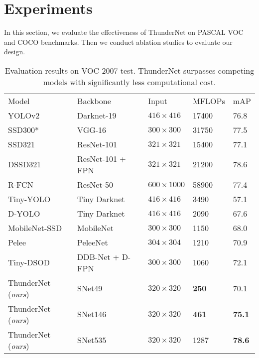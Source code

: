 

\section{Experiments}

In this section, we evaluate the effectiveness of ThunderNet on PASCAL VOC \cite{everingham2010pascal} and COCO \cite{lin2014microsoft} benchmarks.
Then we conduct ablation studies to evaluate our design.

\begin{table*}[!t]
\scriptsize
\centering
\begin{tabular}{p{11em}|P{10em}|P{8em}|P{6em}|P{4em}}
Model & Backbone & Input & MFLOPs & mAP \\ 
YOLOv2 \cite{redmon2017yolo9000} & Darknet-19 & $416 \times 416$ & 17400 & 76.8 \\
SSD300* \cite{liu2016ssd} & VGG-16 & $300 \times 300$ & 31750 & 77.5 \\
SSD321 \cite{fu2017dssd} & ResNet-101 & $321 \times 321$ & 15400 & 77.1 \\
DSSD321 \cite{fu2017dssd} & ResNet-101 + FPN & $321 \times 321$ & 21200 & 78.6 \\
R-FCN \cite{dai2016r} & ResNet-50 & $600 \times 1000$ & 58900 & 77.4 \\ \hline
Tiny-YOLO \cite{redmon2017yolo9000} & Tiny Darknet & $416 \times 416$ & 3490 & 57.1 \\
D-YOLO \cite{mehta2018object} & Tiny Darknet & $416 \times 416$ & 2090 & 67.6 \\
MobileNet-SSD \cite{wang2018pelee} & MobileNet & $300 \times 300$ & 1150 & 68.0 \\
Pelee \cite{wang2018pelee} & PeleeNet & $304 \times 304$ & 1210 & 70.9 \\
Tiny-DSOD \cite{li2018tiny} & DDB-Net + D-FPN & $300 \times 300$ & 1060 & 72.1 \\ \hline
ThunderNet (\emph{ours}) & SNet49 & $320 \times 320$ & \textbf{250} & 70.1 \\
ThunderNet (\emph{ours}) & SNet146 & $320 \times 320$ & \textbf{461} & \textbf{75.1} \\
ThunderNet (\emph{ours}) & SNet535 & $320 \times 320$ & 1287 & \textbf{78.6} \\
\end{tabular}
\vspace{3pt}
\caption{
Evaluation results on VOC 2007 test.
ThunderNet surpasses competing models with significantly less computational cost.
}
\label{table:results-voc}
\end{table*}

